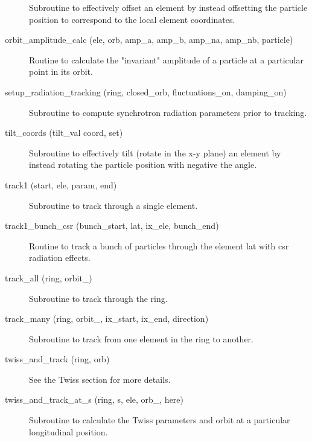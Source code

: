 \begin{description}
\item[\protect\parbox{6in}{offset\_particle (ele, param, coord, set, 
set\_canonical, \\
\hspace*{2in} set\_tilt, set\_multipoles, set\_hvkicks, s\_pos)}] \Newline
Subroutine to effectively offset an element by instead offsetting 
the particle position to correspond to the local element coordinates. 

\item[orbit\_amplitude\_calc (ele, orb, amp\_a, amp\_b, amp\_na, amp\_nb, particle)] \Newline
Routine to calculate the "invariant" amplitude of a particle at a 
particular point in its orbit. 

\item[setup\_radiation\_tracking (ring, closed\_orb, fluctuations\_on, damping\_on)] \Newline
Subroutine to compute synchrotron radiation parameters prior to tracking. 

\item[tilt\_coords (tilt\_val coord, set)] \Newline
Subroutine to effectively tilt (rotate in the x-y plane) an element by 
instead rotating the particle position with negative the angle. 

\item[track1 (start, ele, param, end)] \Newline
Subroutine to track through a single element. 

\item[track1\_bunch\_csr (bunch\_start, lat, ix\_ele, bunch\_end)] \Newline 
Routine to track a bunch of particles through the element lat%
with csr radiation effects.

\item[track\_all (ring, orbit\_)] \Newline
Subroutine to track through the ring. 

\item[track\_many (ring, orbit\_, ix\_start, ix\_end, direction)] \Newline
Subroutine to track from one element in the ring to another. 

\item[twiss\_and\_track (ring, orb)] \Newline
See the Twiss section for more details. 

\item[twiss\_and\_track\_at\_s (ring, s, ele, orb\_, here)] \Newline
Subroutine to calculate the Twiss parameters and orbit at a particular longitudinal position. 


\end{description}
